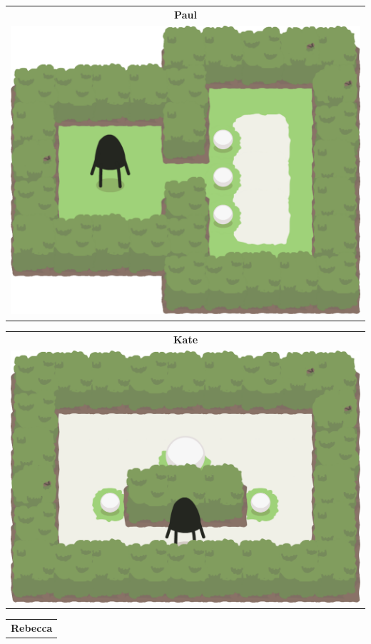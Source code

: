 \documentclass{report}
\theoremstyle{plain}
\begin{document}
\begin{center}
\begin{tabular}{c}
\end{tabular}
\begin{tabular}{c}
\textbf{Paul} \\
\includegraphics[scale=\levelAnnexWidth]{paul-1.png}
\end{tabular}
\begin{tabular}{c}
\textbf{Kate} \\
\includegraphics[scale=\levelAnnexWidth]{kate-1.png}
\end{tabular}
\begin{tabular}{c}
\textbf{Rebecca} \\

\end{tabular}
\end{center}
\end{document}
